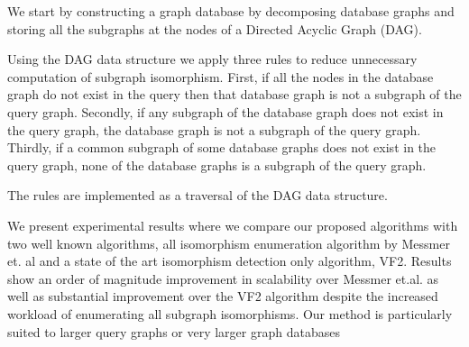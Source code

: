 We start by constructing a graph database by decomposing database graphs and storing all the subgraphs at the nodes of a Directed Acyclic Graph (DAG).

Using the DAG data structure we apply three rules to reduce unnecessary computation of subgraph isomorphism. First, if all the nodes in the database graph do not exist in the query then that database graph is not a subgraph of the query graph. Secondly, if any subgraph of the database graph does not exist in the query graph, the database graph is not a subgraph of the query graph. Thirdly, if a common subgraph of some database graphs does not exist in the query graph, none of the database graphs is a subgraph of the query graph.

The rules are implemented as a traversal of the DAG data structure. 

We present experimental results where we compare our proposed algorithms with two well known algorithms, all isomorphism enumeration algorithm by Messmer et. al and a state of the art isomorphism detection only algorithm, VF2. Results show an order of magnitude improvement in scalability over Messmer et.al. as well as substantial improvement over the VF2 algorithm despite the increased workload of enumerating all subgraph isomorphisms. Our method is particularly suited to larger query graphs or very larger graph databases


